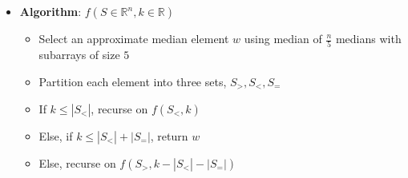 \documentclass[10pt,landscape,a4paper]{article}
\begin{document}
\begin{multicols*}{3}
\begin{itemize}
    \item \textbf{Algorithm}: $f(S \in \mathbb{R}^n, k \in \mathbb{R})$
    \begin{itemize}
        \item Select an approximate median element $w$ using median of $\frac{n}{5}$ medians with subarrays of size $5$
        \item Partition each element into three sets, $S_{>}, S_{<}, S_{=}$
        \item If $k \le |S_{<}|$, recurse on $f(S_{<}, k)$
        \item Else, if $k \le |S_{<}| + |S_{=}|$, return $w$
        \item Else, recurse on $f(S_{>}, k - |S_{<}| - |S_{=}|)$
    \end{itemize}
\end{itemize}



\end{multicols*}
\end{document}
